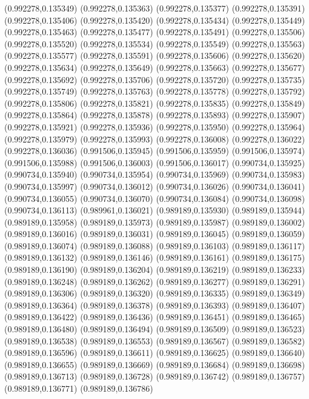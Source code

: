 (0.992278,0.135349)
(0.992278,0.135363)
(0.992278,0.135377)
(0.992278,0.135391)
(0.992278,0.135406)
(0.992278,0.135420)
(0.992278,0.135434)
(0.992278,0.135449)
(0.992278,0.135463)
(0.992278,0.135477)
(0.992278,0.135491)
(0.992278,0.135506)
(0.992278,0.135520)
(0.992278,0.135534)
(0.992278,0.135549)
(0.992278,0.135563)
(0.992278,0.135577)
(0.992278,0.135591)
(0.992278,0.135606)
(0.992278,0.135620)
(0.992278,0.135634)
(0.992278,0.135649)
(0.992278,0.135663)
(0.992278,0.135677)
(0.992278,0.135692)
(0.992278,0.135706)
(0.992278,0.135720)
(0.992278,0.135735)
(0.992278,0.135749)
(0.992278,0.135763)
(0.992278,0.135778)
(0.992278,0.135792)
(0.992278,0.135806)
(0.992278,0.135821)
(0.992278,0.135835)
(0.992278,0.135849)
(0.992278,0.135864)
(0.992278,0.135878)
(0.992278,0.135893)
(0.992278,0.135907)
(0.992278,0.135921)
(0.992278,0.135936)
(0.992278,0.135950)
(0.992278,0.135964)
(0.992278,0.135979)
(0.992278,0.135993)
(0.992278,0.136008)
(0.992278,0.136022)
(0.992278,0.136036)
(0.991506,0.135945)
(0.991506,0.135959)
(0.991506,0.135974)
(0.991506,0.135988)
(0.991506,0.136003)
(0.991506,0.136017)
(0.990734,0.135925)
(0.990734,0.135940)
(0.990734,0.135954)
(0.990734,0.135969)
(0.990734,0.135983)
(0.990734,0.135997)
(0.990734,0.136012)
(0.990734,0.136026)
(0.990734,0.136041)
(0.990734,0.136055)
(0.990734,0.136070)
(0.990734,0.136084)
(0.990734,0.136098)
(0.990734,0.136113)
(0.989961,0.136021)
(0.989189,0.135930)
(0.989189,0.135944)
(0.989189,0.135958)
(0.989189,0.135973)
(0.989189,0.135987)
(0.989189,0.136002)
(0.989189,0.136016)
(0.989189,0.136031)
(0.989189,0.136045)
(0.989189,0.136059)
(0.989189,0.136074)
(0.989189,0.136088)
(0.989189,0.136103)
(0.989189,0.136117)
(0.989189,0.136132)
(0.989189,0.136146)
(0.989189,0.136161)
(0.989189,0.136175)
(0.989189,0.136190)
(0.989189,0.136204)
(0.989189,0.136219)
(0.989189,0.136233)
(0.989189,0.136248)
(0.989189,0.136262)
(0.989189,0.136277)
(0.989189,0.136291)
(0.989189,0.136306)
(0.989189,0.136320)
(0.989189,0.136335)
(0.989189,0.136349)
(0.989189,0.136364)
(0.989189,0.136378)
(0.989189,0.136393)
(0.989189,0.136407)
(0.989189,0.136422)
(0.989189,0.136436)
(0.989189,0.136451)
(0.989189,0.136465)
(0.989189,0.136480)
(0.989189,0.136494)
(0.989189,0.136509)
(0.989189,0.136523)
(0.989189,0.136538)
(0.989189,0.136553)
(0.989189,0.136567)
(0.989189,0.136582)
(0.989189,0.136596)
(0.989189,0.136611)
(0.989189,0.136625)
(0.989189,0.136640)
(0.989189,0.136655)
(0.989189,0.136669)
(0.989189,0.136684)
(0.989189,0.136698)
(0.989189,0.136713)
(0.989189,0.136728)
(0.989189,0.136742)
(0.989189,0.136757)
(0.989189,0.136771)
(0.989189,0.136786)
